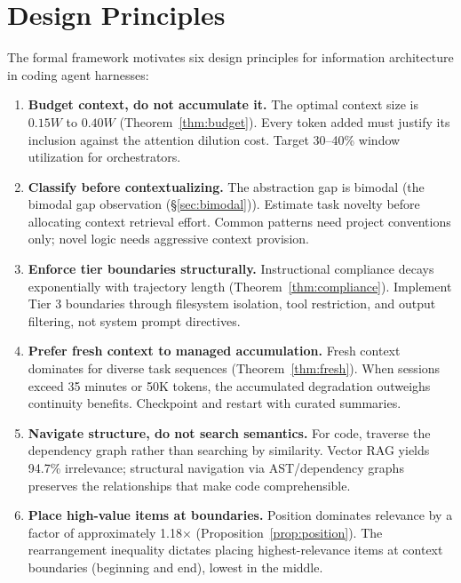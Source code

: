 \documentclass[11pt, a4paper, copyright]{googledeepmind}
\begin{document}
\section{Design Principles}
\label{sec:design}

The formal framework motivates six design principles for information architecture in coding agent harnesses:

\begin{enumerate}
    \item \textbf{Budget context, do not accumulate it.} The optimal context size is $0.15W$ to $0.40W$ (Theorem~\ref{thm:budget}). Every token added must justify its inclusion against the attention dilution cost. Target 30--40\% window utilization for orchestrators.

    \item \textbf{Classify before contextualizing.} The abstraction gap is bimodal (the bimodal gap observation (\S\ref{sec:bimodal})). Estimate task novelty before allocating context retrieval effort. Common patterns need project conventions only; novel logic needs aggressive context provision.

    \item \textbf{Enforce tier boundaries structurally.} Instructional compliance decays exponentially with trajectory length (Theorem~\ref{thm:compliance}). Implement Tier 3 boundaries through filesystem isolation, tool restriction, and output filtering, not system prompt directives.

    \item \textbf{Prefer fresh context to managed accumulation.} Fresh context dominates for diverse task sequences (Theorem~\ref{thm:fresh}). When sessions exceed 35 minutes or 50K tokens, the accumulated degradation outweighs continuity benefits. Checkpoint and restart with curated summaries.

    \item \textbf{Navigate structure, do not search semantics.} For code, traverse the dependency graph rather than searching by similarity. Vector RAG yields 94.7\% irrelevance; structural navigation via AST/dependency graphs preserves the relationships that make code comprehensible.

    \item \textbf{Place high-value items at boundaries.} Position dominates relevance by a factor of approximately 1.18$\times$ (Proposition~\ref{prop:position}). The rearrangement inequality dictates placing highest-relevance items at context boundaries (beginning and end), lowest in the middle.
\end{enumerate}
\end{document}
